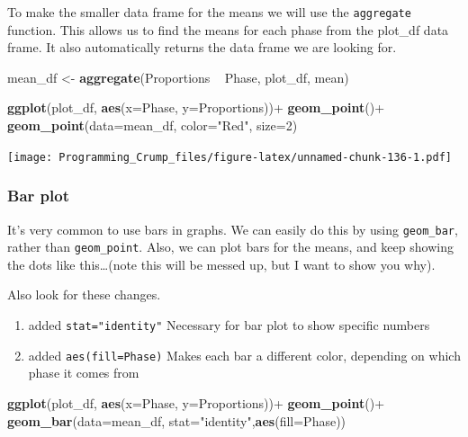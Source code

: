 \documentclass[]{book}
\newenvironment{Shaded}{\begin{snugshade}}{\end{snugshade}}
\newcommand{\KeywordTok}[1]{\textcolor[rgb]{0.13,0.29,0.53}{\textbf{{#1}}}}
\newcommand{\DataTypeTok}[1]{\textcolor[rgb]{0.13,0.29,0.53}{{#1}}}
\newcommand{\DecValTok}[1]{\textcolor[rgb]{0.00,0.00,0.81}{{#1}}}
\newcommand{\StringTok}[1]{\textcolor[rgb]{0.31,0.60,0.02}{{#1}}}
\newcommand{\NormalTok}[1]{{#1}}
\providecommand{\tightlist}{%
  \setlength{\itemsep}{0pt}\setlength{\parskip}{0pt}}
\theoremstyle{definition}
\theoremstyle{definition}
\theoremstyle{definition}
\theoremstyle{remark}
\begin{document}
To make the smaller data frame for the means we will use the
\texttt{aggregate} function. This allows us to find the means for each
phase from the plot\_df data frame. It also automatically returns the
data frame we are looking for.

\begin{Shaded}
\begin{Highlighting}[]
\NormalTok{mean_df <-}\StringTok{ }\KeywordTok{aggregate}\NormalTok{(Proportions ~}\StringTok{ }\NormalTok{Phase, plot_df, mean)}

\KeywordTok{ggplot}\NormalTok{(plot_df, }\KeywordTok{aes}\NormalTok{(}\DataTypeTok{x=}\NormalTok{Phase, }\DataTypeTok{y=}\NormalTok{Proportions))+}\StringTok{ }
\StringTok{  }\KeywordTok{geom_point}\NormalTok{()+}
\StringTok{  }\KeywordTok{geom_point}\NormalTok{(}\DataTypeTok{data=}\NormalTok{mean_df, }\DataTypeTok{color=}\StringTok{"Red"}\NormalTok{, }\DataTypeTok{size=}\DecValTok{2}\NormalTok{)}
\end{Highlighting}
\end{Shaded}

\texttt{[image: Programming\_Crump\_files/figure-latex/unnamed-chunk-136-1.pdf]}

\subsubsection{Bar plot}\label{bar-plot}

It's very common to use bars in graphs. We can easily do this by using
\texttt{geom\_bar}, rather than \texttt{geom\_point}. Also, we can plot
bars for the means, and keep showing the dots like this\ldots{}(note
this will be messed up, but I want to show you why).

Also look for these changes.

\begin{enumerate}
\def\labelenumi{\arabic{enumi}.}
\tightlist
\item
  added \texttt{stat="identity"} Necessary for bar plot to show specific
  numbers
\item
  added \texttt{aes(fill=Phase)} Makes each bar a different color,
  depending on which phase it comes from
\end{enumerate}

\begin{Shaded}
\begin{Highlighting}[]
\KeywordTok{ggplot}\NormalTok{(plot_df, }\KeywordTok{aes}\NormalTok{(}\DataTypeTok{x=}\NormalTok{Phase, }\DataTypeTok{y=}\NormalTok{Proportions))+}\StringTok{ }
\StringTok{  }\KeywordTok{geom_point}\NormalTok{()+}
\StringTok{  }\KeywordTok{geom_bar}\NormalTok{(}\DataTypeTok{data=}\NormalTok{mean_df, }\DataTypeTok{stat=}\StringTok{"identity"}\NormalTok{,}\KeywordTok{aes}\NormalTok{(}\DataTypeTok{fill=}\NormalTok{Phase))}
\end{Highlighting}
\end{Shaded}
\end{document}
